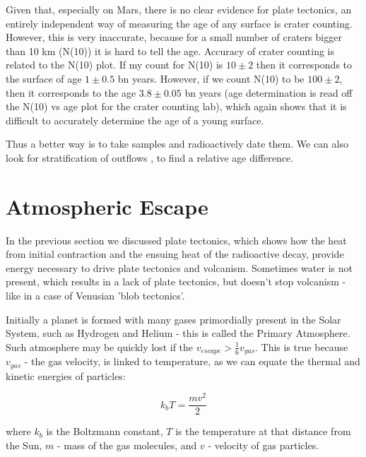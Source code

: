 \documentclass[paper=a4, fontsize=11pt]{scrartcl} %
\numberwithin{equation}{section} %
\begin{document}
Given that, especially on Mars, there is no clear evidence for plate tectonics, an entirely independent way of measuring the age of any surface is crater counting. However, this is very inaccurate, because for a small number of  craters bigger than 10 km (N(10))   it is hard to tell the age. Accuracy of crater counting is related to the N(10) plot.  If my count for N(10) is  $10 \pm 2$ then it corresponds to the surface of age  $1 \pm 0.5$ bn years. However, if we count N(10) to be $100 \pm 2$, then it corresponds to the age $3.8 \pm 0.05$ bn years  (age determination is read off the N(10) vs age plot for the crater counting lab),  which again shows that it is difficult to accurately determine the age of a young surface. 

Thus a better way is to take samples and radioactively date them. We can also look for stratification of outflows , to find a relative age difference.  




\section{Atmospheric Escape}

In the previous section we discussed plate tectonics, which shows how the heat from initial contraction and the ensuing heat of the radioactive decay, provide energy necessary to drive plate tectonics and volcanism. Sometimes water is not present, which results in a lack of plate tectonics, but doesn't stop volcanism - like in a case of Venusian 'blob tectonics'.  

Initially a planet is formed with many gases primordially present in the Solar System, such as Hydrogen and Helium - this is called the Primary Atmosphere. Such atmosphere may be quickly lost if the $v_{escape} > \frac{1}{6} v_{gas}$.   This is true because  $v_{gas}$ - the gas velocity, is linked to temperature, as we can equate  the thermal and kinetic energies of particles: 

\begin{equation}
k_{b}T = \frac{m v^{2}}{2}
\end{equation}

where $k_{b}$ is the Boltzmann constant, $T$ is the temperature at that distance from the Sun, $m$ - mass of the gas molecules, and $v$ - velocity of gas particles. 
\end{document}
